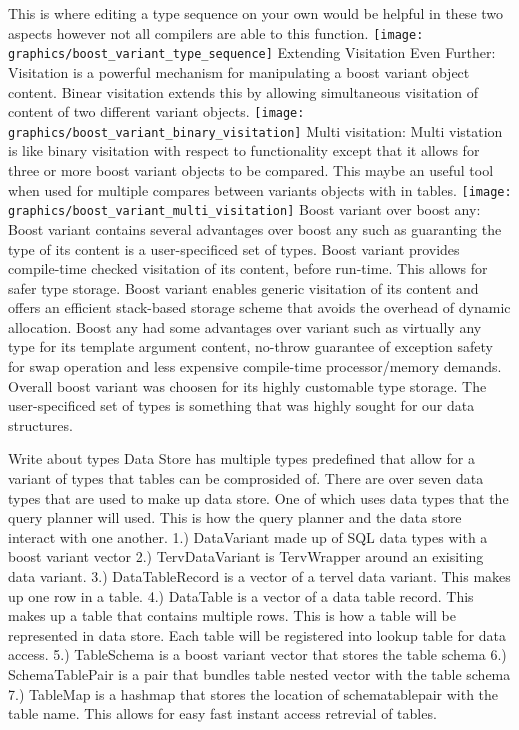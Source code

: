 \documentclass[letterpaper, 12pt]{article}
\begin{document}
	This is where editing a type sequence on your own would be helpful in these two aspects however not all compilers are able to         
 this function. 
	\texttt{[image: graphics/boost\_variant\_type\_sequence]}
	Extending Visitation Even Further:
	Visitation is a powerful mechanism for manipulating a boost variant object content. Binear visitation extends this by allowing 			simultaneous visitation of content of two different variant objects. 
	\texttt{[image: graphics/boost\_variant\_binary\_visitation]}
	Multi visitation:
	Multi vistation is like binary visitation with respect to functionality except that it allows for three or more boost variant objects to be compared. This maybe an useful tool when used for multiple compares between variants objects with in tables.
	\texttt{[image: graphics/boost\_variant\_multi\_visitation]}
	Boost variant over boost any:
	Boost variant contains several advantages over boost any such as guaranting the type of its content is a user-specificed set
	of types. Boost variant provides compile-time checked visitation of its content, before run-time. This allows for safer type storage. Boost variant enables generic visitation of its content and offers an efficient stack-based storage scheme that avoids the overhead of dynamic allocation. Boost any had some advantages over variant such as virtually any type for its template argument content, no-throw guarantee of exception safety for swap operation and less expensive compile-time processor/memory demands. Overall boost variant was choosen for its highly customable type storage. The user-specificed set of types is something that was highly sought for our data structures.
	
Write about types
	Data Store has multiple types predefined that allow for a variant of types that tables can be
	comprosided of. There are over seven data types that are used to make up data store. One of which
	uses data types that the query planner will used. This is how the query planner and the data store
	interact with one another. 
1.) DataVariant made up of SQL data types with a boost variant vector 
2.)	TervDataVariant is TervWrapper around an exisiting data variant.
3.)	DataTableRecord is a vector of a tervel data variant. This makes up one row in 
	a table.
4.)	DataTable is a vector of a data table record. This makes up a table that contains multiple rows.
	This is how a table will be represented in data store. Each table will be registered into lookup table
	for data access.
5.)	TableSchema is a boost variant vector that stores the table schema
6.)	SchemaTablePair is a pair that bundles table nested vector with the table schema
7.)	TableMap is a hashmap that stores the location of schematablepair with the table name. This
	allows for easy fast instant access retrevial of tables.
	
\end{document}
